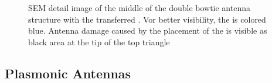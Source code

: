 	\begin{figure}[tp]
		\centering
		\caption{SEM detail image of the middle of the double bowtie antenna structure with the transferred \nd. Vor better visibility, the \nd is colored blue. Antenna damage caused by the placement of the \nd is visible as black area at the tip of the top triangle}
		\label{fig::place_antenna_sem}
	\end{figure}

	\subsection{Plasmonic Antennas}

